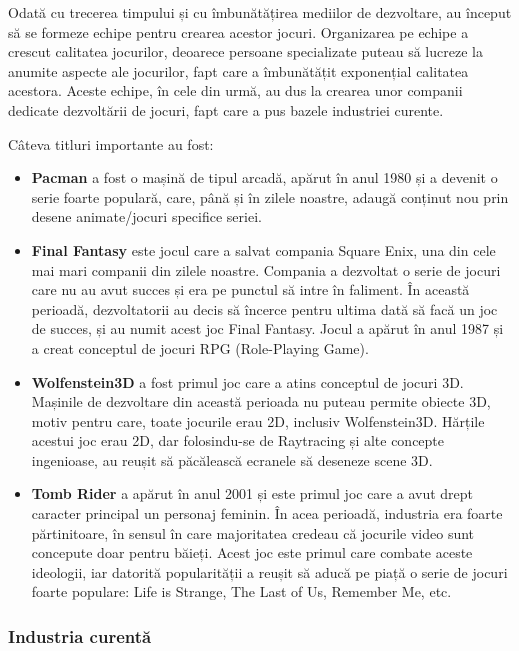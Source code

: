\documentclass[12pt, a4paper]{article}
\begin{document}
	Odată cu trecerea timpului și cu îmbunătățirea mediilor de dezvoltare, au început să se formeze echipe pentru crearea acestor jocuri. Organizarea pe echipe a crescut calitatea jocurilor, deoarece persoane specializate puteau să lucreze la anumite aspecte ale jocurilor, fapt care a îmbunătățit exponențial calitatea acestora. Aceste echipe, în cele din urmă, au dus la crearea unor companii dedicate dezvoltării de jocuri, fapt care a pus bazele industriei curente.
	\newline
	
	Câteva titluri importante au fost:
	
	\begin{itemize}
		\item \textbf{Pacman} a fost o mașină de tipul arcadă, apărut în anul 1980 și a devenit o serie foarte populară, care, până și în zilele noastre, adaugă conținut nou prin desene animate/jocuri specifice seriei.
		\item \textbf{Final Fantasy} este jocul care a salvat compania Square Enix, una din cele mai mari companii din zilele noastre. Compania a dezvoltat o serie de jocuri care nu au avut succes și era pe punctul să intre în faliment. În această perioadă, dezvoltatorii au decis să încerce pentru ultima dată să facă un joc de succes, și au numit acest joc Final Fantasy. Jocul a apărut în anul 1987 și a creat conceptul de jocuri RPG (Role-Playing Game).
		\item \textbf{Wolfenstein3D} a fost primul joc care a atins conceptul de jocuri 3D. Mașinile de dezvoltare din această perioada nu puteau permite obiecte 3D, motiv pentru care, toate jocurile erau 2D, inclusiv Wolfenstein3D. Hărțile acestui joc erau 2D, dar folosindu-se de Raytracing și alte concepte ingenioase, au reușit să păcălească ecranele să deseneze scene 3D.
		\item \textbf{Tomb Rider} a apărut în anul 2001 și este primul joc care a avut drept caracter principal un personaj feminin. În acea perioadă, industria era foarte părtinitoare, în sensul în care majoritatea credeau că jocurile video sunt concepute doar pentru băieți. Acest joc este primul care combate aceste ideologii, iar datorită popularității a reușit să aducă pe piață o serie de jocuri foarte populare: Life is Strange, The Last of Us, Remember Me, etc.
	\end{itemize}	

	
	
	
	
	\subsubsection{Industria curentă}
	
\end{document}
